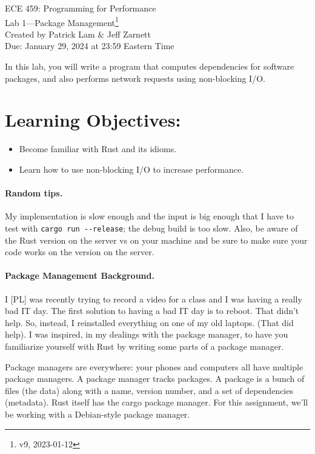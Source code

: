 \documentclass[12pt]{article}
\renewcommand{\_}{\kern-1.5pt\textunderscore\kern-1.5pt}
\begin{document}
\begin{center}
{\Large ECE 459: Programming for Performance}\\
{\Large Lab 1---Package Management\footnote{v9, 2023-01-12}}\\[1em]
Created by Patrick Lam \& Jeff Zarnett\\
Due: January 29, 2024 at 23:59 Eastern Time
\end{center}


\vspace{1em}
In this lab, you will write a program that computes dependencies for software packages, and also performs network requests using non-blocking I/O.

\section*{Learning Objectives:}
\begin{itemize}
	\item Become familiar with Rust and its idioms.
	\item Learn how to use non-blocking I/O to increase performance.
\end{itemize}

\paragraph*{Random tips.} My implementation is slow enough and the input is big enough that I have to test with \verb+cargo run --release+; the debug build is too slow. Also, be aware of the Rust version on the server vs on your machine and be sure to make sure your code works on the version on the server.


\paragraph*{Package Management Background.}
I [PL] was recently trying to record a video for a class and I was having a really bad IT day. The first solution to having a bad IT day is to reboot. That didn't help. So, instead, I reinstalled everything on one of my old laptops. (That did help). I was inspired, in my dealings with the package manager, to have you familiarize yourself with Rust by writing some parts of a package manager. \par

\vspace{1em}
Package managers are everywhere: your phones and computers all have multiple package managers. A package manager tracks packages. A package is a bunch of files (the data) along with a name, version number, and a set of dependencies (metadata). Rust itself has the cargo package manager. For this assignment, we'll be working with a Debian-style package manager. \par
\end{document}
